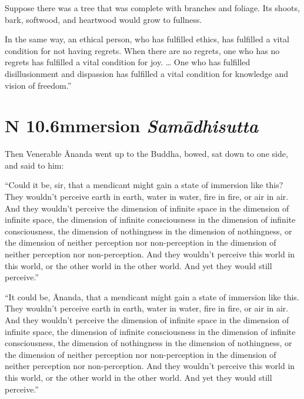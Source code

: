 \documentclass[12pt,openany]{book}%
\newcommand*{\suttatitleacronym}[1]{\smaller[2]{#1}\vspace*{.3em}}
\newcommand*{\suttatitletranslation}[1]{\linebreak{#1}}
\newcommand*{\suttatitleroot}[1]{\linebreak\smaller[2]\itshape{#1}}
\newcommand*{\tocacronym}[1]{\hspace*{-3.3em}{#1}\quad}
\newcommand*{\toctranslation}[1]{#1}
\newcommand*{\tocroot}[1]{(\textit{#1})}
\begin{document}
Suppose there was a tree that was complete with branches and foliage. Its shoots, bark, softwood, and heartwood would grow to fullness. 

In the same way, an ethical person, who has fulfilled ethics, has fulfilled a vital condition for not having regrets. When there are no regrets, one who has no regrets has fulfilled a vital condition for joy. … One who has fulfilled disillusionment and dispassion has fulfilled a vital condition for knowledge and vision of freedom.” 

%
\section*{{\suttatitleacronym AN 10.6}{\suttatitletranslation Immersion }{\suttatitleroot Samādhisutta}}
\addcontentsline{toc}{section}{\tocacronym{AN 10.6} \toctranslation{Immersion } \tocroot{Samādhisutta}}

Then Venerable Ānanda went up to the Buddha, bowed, sat down to one side, and said to him: 

“Could it be, sir, that a mendicant might gain a state of immersion like this? They wouldn’t perceive earth in earth, water in water, fire in fire, or air in air. And they wouldn’t perceive the dimension of infinite space in the dimension of infinite space, the dimension of infinite consciousness in the dimension of infinite consciousness, the dimension of nothingness in the dimension of nothingness, or the dimension of neither perception nor non-perception in the dimension of neither perception nor non-perception. And they wouldn’t perceive this world in this world, or the other world in the other world. And yet they would still perceive.” 

“It could be, Ānanda, that a mendicant might gain a state of immersion like this. They wouldn’t perceive earth in earth, water in water, fire in fire, or air in air. And they wouldn’t perceive the dimension of infinite space in the dimension of infinite space, the dimension of infinite consciousness in the dimension of infinite consciousness, the dimension of nothingness in the dimension of nothingness, or the dimension of neither perception nor non-perception in the dimension of neither perception nor non-perception. And they wouldn’t perceive this world in this world, or the other world in the other world. And yet they would still perceive.” 
\end{document}
